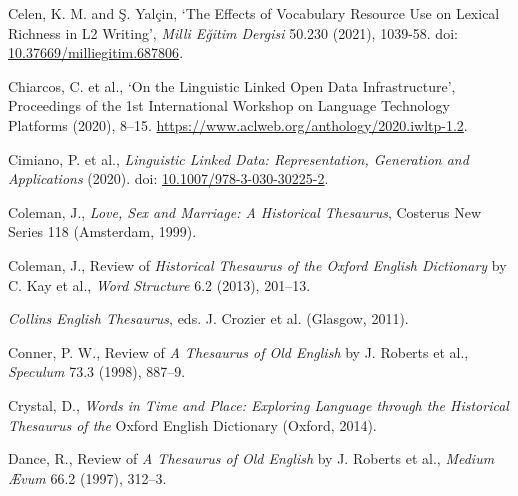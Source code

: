 \begin{list}{}
\item %
Celen, K. M. and Ş. Yalçin, `The Effects of Vocabulary Resource Use on Lexical Richness in L2 Writing', \textit{Milli Eğitim Dergisi} 50.230 (2021), 1039-58. doi: \href{https://doi.org/10.37669/milliegitim.687806}{\url{10.37669/milliegitim.687806}}.

\item %
Chiarcos, C. et al., `On the Linguistic Linked Open Data Infrastructure', Proceedings of the 1st International Workshop on Language Technology Platforms (2020), 8–15. \url{https://www.aclweb.org/anthology/2020.iwltp-1.2}.

\item %
Cimiano, P. et al., \textit{Linguistic Linked Data: Representation, Generation and Applications} (2020). doi: \href{https://doi.org/10.1007/978-3-030-30225-2}{\url{10.1007/978-3-030-30225-2}}.


\item %
Coleman, J., \textit{Love, Sex and Marriage: A Historical Thesaurus}, Costerus New Series 118 (Amsterdam, 1999).

\item %
Coleman, J., Review of \textit{Historical Thesaurus of the Oxford English Dictionary} by C. Kay et al., \textit{Word Structure} 6.2 (2013), 201–13.

\item  %
\textit{Collins English Thesaurus}, eds. J. Crozier et al. (Glasgow, 2011). %

\item %
Conner, P. W., Review of \textit{A Thesaurus of Old English} by J. Roberts et al., \textit{Speculum} 73.3 (1998), 887–9.

\item %
Crystal, D., \textit{Words in Time and Place: Exploring Language through the Historical Thesaurus of the} Oxford English Dictionary (Oxford, 2014).

\item %
Dance, R., Review of \textit{A Thesaurus of Old English} by J. Roberts et al., \textit{Medium Ævum} 66.2 (1997), 312–3.


\end{list}
